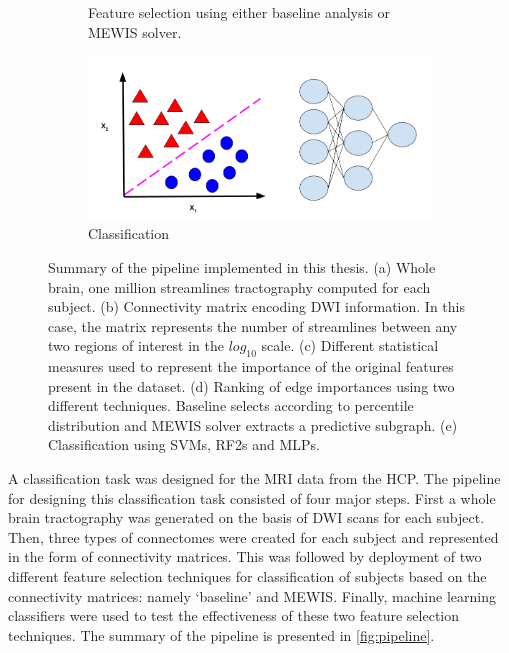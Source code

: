 \documentclass[msthesis.tex]{subfiles}
\begin{document}
\begin{figure}
\begin{subfigure}[b]{0.9\textwidth}
\begin{subfigure}[b]{0.4\textwidth}
         \label{fig:mewspip}
         \end{subfigure}
    \vspace{-2em}
     \caption{Feature selection using either baseline analysis or MEWIS solver.}
    \end{subfigure}
    \vfill
        \begin{subfigure}[b]{0.6\textwidth}
         \centering
         \includegraphics[height =0.4\textwidth,width=\textwidth]{images/classification.png}
         \caption{Classification}
         \label{fig:three sin x}
         \end{subfigure}
    \caption{Summary of the pipeline implemented in this thesis. (a) Whole brain, one million streamlines tractography computed for each subject. (b) Connectivity matrix encoding DWI information. In this case, the matrix represents the number of streamlines between any two regions of interest in the $log_{10}$ scale. (c) Different statistical measures used to represent the importance of the original features present in the dataset. (d) Ranking of edge importances using two different techniques. Baseline selects according to percentile distribution and MEWIS solver extracts a predictive subgraph. (e) Classification using \gls{SVM}s, \gls{RF2}s and \gls{MLP}s.}
    \label{fig:pipeline}
\end{figure}

A classification task was designed for the MRI data from the \gls{HCP}. The pipeline for designing this classification task consisted of four major steps. First a whole brain tractography was generated on the basis of \gls{DWI} scans for each subject. Then, three types of connectomes were created for each subject and represented in the form of connectivity matrices. This was followed by deployment of two different feature selection techniques for classification of subjects based on the connectivity matrices: namely `baseline' and \gls{MEWIS}. Finally, machine learning classifiers were used to test the effectiveness of these two feature selection techniques. The summary of the pipeline is presented in \autoref{fig:pipeline}.
\end{document}
